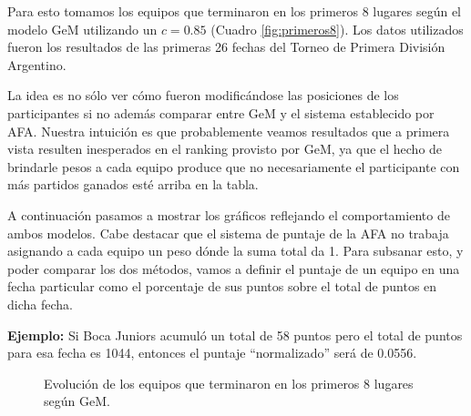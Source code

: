 Para esto tomamos los equipos que terminaron en los primeros 8 lugares según el modelo
GeM utilizando un $c = 0.85$ (Cuadro \ref{fig:primeros8}). Los datos utilizados
fueron los resultados de las primeras 26 fechas del Torneo de Primera División
Argentino.

La idea es no sólo ver cómo fueron modificándose las posiciones de los
participantes si no además comparar entre GeM y el sistema establecido por AFA.
Nuestra intuición es que probablemente veamos resultados que a primera vista
resulten inesperados en el ranking provisto por GeM, ya que el hecho de
brindarle pesos a cada equipo produce que no necesariamente el participante con
más partidos ganados esté arriba en la tabla.

A continuación pasamos a mostrar los gráficos reflejando el comportamiento de
ambos modelos. Cabe destacar que el sistema de puntaje de la AFA no trabaja
asignando a cada equipo un peso dónde la suma total da 1. Para subsanar esto,
y poder comparar los dos métodos, vamos a definir el puntaje de un equipo en una
fecha particular como el porcentaje de sus puntos sobre el total de puntos en dicha
fecha.

\textbf{Ejemplo:} Si Boca Juniors acumuló un total de 58 puntos pero el total de
puntos para esa fecha es 1044, entonces el puntaje ``normalizado'' será de
0.0556.

\begin{figure}[H]
	\centering
	\caption{Evolución de los equipos que terminaron en los primeros 8 lugares
	según GeM.}
	\label{fig:gem_evo}
\end{figure}

